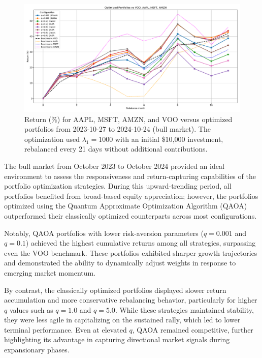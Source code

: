 \documentclass[12pt]{article}
\begin{document}
\begin{figure}[H]
    \centering
    \includegraphics[width=1.0\textwidth]{figures/_VOO_bb_bull_study_post.pdf}
    \caption{Return (\%) for AAPL, MSFT, AMZN, and VOO versus optimized portfolios from 2023-10-27 to 2024-10-24 (bull market). The optimization used $\lambda_{1} = 1000$ with an initial \$10{,}000 investment, rebalanced every 21 days without additional contributions.}
    \label{fig:VOO_bb_bull_study}
\end{figure}

The bull market from October 2023 to October 2024 provided an ideal environment to assess the responsiveness and return-capturing capabilities of the portfolio optimization strategies. During this upward-trending period, all portfolios benefited from broad-based equity appreciation; however, the portfolios optimized using the Quantum Approximate Optimization Algorithm (QAOA) outperformed their classically optimized counterparts across most configurations.

Notably, QAOA portfolios with lower risk-aversion parameters (\( q = 0.001 \) and \( q = 0.1 \)) achieved the highest cumulative returns among all strategies, surpassing even the VOO benchmark. These portfolios exhibited sharper growth trajectories and demonstrated the ability to dynamically adjust weights in response to emerging market momentum.

By contrast, the classically optimized portfolios displayed slower return accumulation and more conservative rebalancing behavior, particularly for higher \( q \) values such as \( q = 1.0 \) and \( q = 5.0 \). While these strategies maintained stability, they were less agile in capitalizing on the sustained rally, which led to lower terminal performance. Even at elevated \( q \), QAOA remained competitive, further highlighting its advantage in capturing directional market signals during expansionary phases.
\end{document}

